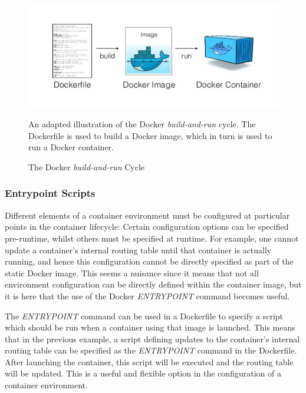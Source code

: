     \begin{figure}[ht]
      \centering
      \includegraphics[width=160mm, scale=1]{Images/Docker_build_and_run_cycle.png}
      \caption{The Docker \textit{build-and-run} Cycle} 
      \medskip
	  \small
		An adapted illustration of the Docker \textit{build-and-run} cycle. The Dockerfile is used to build a Docker image, which in turn is used to run a Docker container.
\label{fig:DockerBuildAndRun}
\end{figure}



\subsubsection{Entrypoint Scripts}
Different elements of a container environment must be configured at particular points in the container lifecycle: Certain configuration options can be specified pre-runtime, whilst others must be specified at runtime. For example, one cannot update a container's internal routing table until that container is actually running, and hence this configuration cannot be directly specified as part of the static Docker image. This seems a nuisance since it means that not all environment configuration can be directly defined within the container image, but it is here that the use of the Docker \textit{ENTRYPOINT} command becomes useful.

The \textit{ENTRYPOINT} command can be used in a Dockerfile to specify a script which should be run when a container using that image is launched. This means that in the previous example, a script defining updates to the container's internal routing table can be specified as the \textit{ENTRYPOINT} command in the Dockerfile. After launching the container, this script will be executed and the routing table will be updated. This is a useful and flexible option in the configuration of a container environment.

